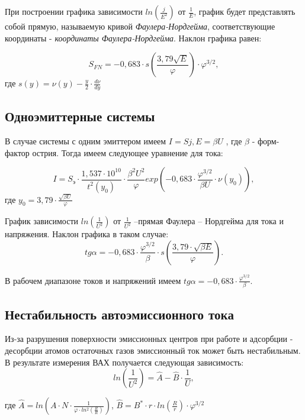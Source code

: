 \documentclass[a4paper,12pt]{article}
\theoremstyle{plain} %
\theoremstyle{definition} %
\theoremstyle{remark} %
\begin{document}
При построении графика зависимости $ln(\frac{j}{E^{2}})$ от $\frac{1}{E}$, график будет представлять собой
прямую, называемую кривой \textit{Фаулера-Нордгейма}, соответствующие координаты - \textit{координаты Фаулера-Нордгейма}. Наклон графика равен:

\begin{equation*}
    S_{FN} = -0,683\cdot s(\frac{3,79\sqrt{E}}{\varphi})\cdot \varphi^{3/2},
\end{equation*}
где $s(y)=\nu(y)-\frac{y}{2}\cdot\frac{d\nu}{dy}$

\subsection*{Одноэмиттерные системы}

В случае системы с одним эмиттером имеем $I = Sj, E = \beta U$ , где $\beta$ - форм-фактор острия. Тогда имеем следующее уравнение для тока:

\begin{equation*}
    I = S_{э}\cdot \frac{1,537\cdot10^{10}}{t^{2}(y_{0})}\cdot\frac{\beta^2U^2}{\varphi}exp(-0,683\cdot\frac{\varphi^{3/2}}{\beta U}\cdot\nu(y_{0})),
\end{equation*}
где $y_{0} = 3,79\cdot\frac{\sqrt{\beta U}}{\varphi}$

График зависимости $ln(\frac{1}{U^2})$ от $\frac{1}{U^2}$ –прямая Фаулера – Нордгейма для тока и напряжения. Наклон графика в таком случае:
\begin{equation}
    tg\alpha = -0,683\cdot\frac{\varphi^{3/2}}{\beta}\cdot s(\frac{3,79\cdot\sqrt{\beta E}}{\varphi}).
\end{equation}

В рабочем диапазоне токов и напряжений имеем $tg\alpha = -0,683\cdot\frac{\varphi^{3/2}}{\beta}$.

\subsection*{Нестабильность автоэмиссионного тока}
Из-за разрушения поверхности эмиссионных центров при работе и адсорбции - десорбции атомов остаточных газов эмиссионный ток может быть нестабильным. В результате измерения ВАХ получается следующая зависимость:
\begin{equation*}
    ln(\frac{1}{U^{2}}) = \hat{A}-\hat{B}\cdot\frac{1}{U},
\end{equation*}

где $\hat{A}=ln(A\cdot N\cdot \frac{1}{\varphi\cdot ln^2(\frac{R}{R})})$, $\hat{B} = B^{*}\cdot r\cdot ln(\frac{R}{r})\cdot\varphi^{3/2}$
\end{document}
